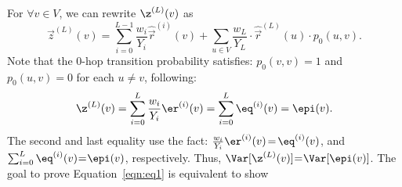 For $\forall v\in V$, we can rewrite $\z^{(L)}(v)$ as
\begin{equation}\nonumber
    \vec{z}^{(L)}(v)=\sum_{i=0}^{L-1} \frac{w_i}{Y_i}\hat{\vec{r}}^{(i)}(v)+ \sum_{u \in V} \frac{w_L}{Y_{L}} \cdot \hat{\vec{r}}^{(L)}(u)\cdot p_{0}(u,v). 
\end{equation}
Note that the $0$-hop transition probability satisfies: $p_0(v,v)=1$ and $p_0(u,v)=0$ for each $u \neq v$, following: 
\begin{equation}\nonumber
\z^{(L)}(v)=\sum_{i=0}^L \frac{w_i}{Y_i}\er^{(i)}(v)=\sum_{i=0}^L \eq^{(i)}(v)=\epi(v).     
\end{equation}
The second and last equality use the fact:  $\frac{w_i}{Y_i}\er^{(i)}(v)\hspace{-0.5mm}=\hspace{-0.5mm}\eq^{(i)}(v)$, and $\sum_{i=0}^L \eq^{(i)}(v)\hspace{-0.8mm}=\hspace{-0.8mm}\epi(v)$, respectively. 
Thus, $\Var[\z^{(L)}(v)]\hspace{-0.8mm}=\hspace{-0.8mm}\Var[\epi(v)]$. The goal to prove Equation~\eqref{eqn:eq1} is equivalent to show 
